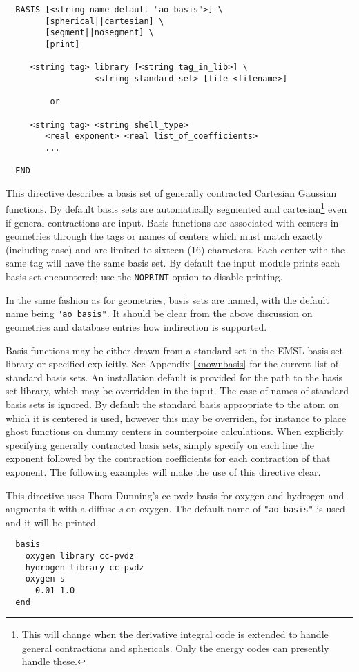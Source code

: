 \begin{verbatim}
  BASIS [<string name default "ao basis">] \
        [spherical||cartesian] \
        [segment||nosegment] \
        [print]

     <string tag> library [<string tag_in_lib>] \
                  <string standard set> [file <filename>]

         or

     <string tag> <string shell_type>
        <real exponent> <real list_of_coefficients>
        ...
     
  END
\end{verbatim}    

This directive describes a basis set of generally contracted Cartesian
Gaussian functions.  By default basis sets are automatically segmented
and cartesian\footnote{This will change when the derivative integral
  code is extended to handle general contractions and sphericals. Only
  the energy codes can presently handle these.} even if general
contractions are input.  Basis functions are associated with centers
in geometries through the tags or names of centers which must match
exactly (including case) and are limited to sixteen (16) characters.
Each center with the same tag will have the same basis set.  By
default the input module prints each basis set encountered; use the
\verb+NOPRINT+ option to disable printing.

In the same fashion as for geometries, basis sets are named, with the
default name being \verb+"ao basis"+.  It should be clear from the
above discussion on geometries and database entries how indirection is
supported.

Basis functions may be either drawn from a standard set in the EMSL
basis set library or specified explicitly.  See Appendix
\ref{knownbasis} for the current list of standard basis sets. An
installation default is provided for the path to the basis set
library, which may be overridden in the input.  The case of names of
standard basis sets is ignored.  By default the standard basis
appropriate to the atom on which it is centered is used, however this
may be overriden, for instance to place ghost functions on dummy
centers in counterpoise calculations.  When explicitly specifying
generally contracted basis sets, simply specify on each line the
exponent followed by the contraction coefficients for each contraction
of that exponent.  The following examples will make the use of this
directive clear.

This directive uses Thom Dunning's cc-pvdz basis for oxygen and
hydrogen and augments it with a diffuse {\em s} on oxygen.
The default name of \verb+"ao basis"+ is used and it will be printed.
\begin{verbatim}
  basis
    oxygen library cc-pvdz
    hydrogen library cc-pvdz
    oxygen s
      0.01 1.0
  end
\end{verbatim}

